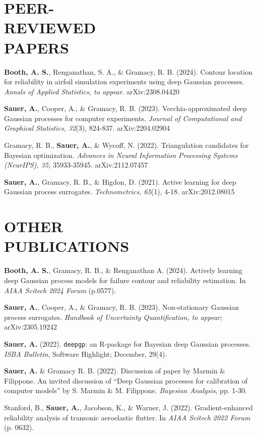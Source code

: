 \documentclass[margin,line,11pt]{res}
\begin{document}
\begin{resume}
\section{\bf{PEER- \\ REVIEWED \\ PAPERS}}

{\bf Booth, A. S.}, Renganathan, S. A., \& Gramacy, R. B. (2024). Contour location
for reliability in airfoil simulation experiments using deep Gaussian
processes.  {\it Annals of Applied Statistics, to appear}. arXiv:2308.04420

{\bf Sauer, A.}, Cooper, A., \& Gramacy, R. B. (2023). Vecchia-approximated
deep Gaussian processes for computer experiments. {\it Journal of Computational
and Graphical Statistics, 32}(3), 824-837. arXiv:2204.02904

Gramacy, R. B., {\bf Sauer, A.}, \& Wycoff, N. (2022). Triangulation 
candidates for Bayesian optimization. {\it Advances in Neural Information
Processing Systems (NeurIPS), 35,} 35933-35945. arXiv:2112.07457

{\bf Sauer, A.}, Gramacy, R. B., \& Higdon, D. (2021). Active learning 
for deep Gaussian process surrogates. {\it Technometrics, 65}(1), 4-18. 
arXiv:2012.08015

\section{OTHER \\ PUBLICATIONS}

{\bf Booth, A. S.}, Gramacy, R. B., \& Renganathan A. (2024). Actively learning deep Gaussian
process models for failure contour and reliability estimation.  In {\it AIAA Scitech 2024 Forum} (p.0577).

{\bf Sauer, A.}, Cooper, A., \& Gramacy, R. B. (2023). Non-stationary
Gaussian process surrogates. {\it Handbook of Uncertainty Quantification, to appear}; arXiv:2305.19242

{\bf Sauer, A.} (2022). {\tt deepgp}: an {\sf R}-package for Bayesian deep Gaussian 
processes.  {\it ISBA Bulletin}, Software Highlight; December, 29(4).

{\bf Sauer, A.} \& Gramacy R. B. (2022). Discussion of paper by Marmin \& Filippone.  An
invited discussion of ``Deep Gaussian processes for calibration of computer models''
by S. Marmin \& M. Filippone. {\it Bayesian Analysis}, pp. 1-30.

Stanford, B., {\bf Sauer, A.}, Jacobson, K., \& Warner, J. (2022). 
Gradient-enhanced reliability analysis of transonic aeroelastic 
flutter. In {\it AIAA Scitech 2022 Forum} (p. 0632).


\end{resume}
\end{document}
